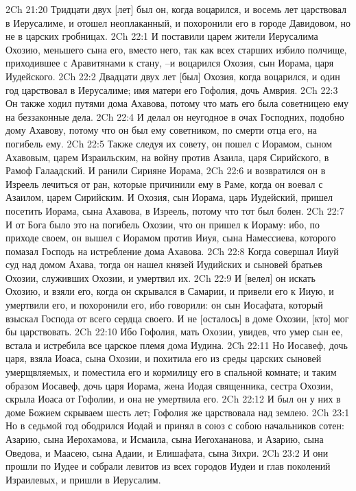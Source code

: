 2Ch 21:20  Тридцати двух [лет] был он, когда воцарился, и восемь лет царствовал в Иерусалиме, и отошел неоплаканный, и похоронили его в городе Давидовом, но не в царских гробницах.
2Ch 22:1  И поставили царем жители Иерусалима Охозию, меньшего сына его, вместо него, так как всех старших избило полчище, приходившее с Аравитянами к стану, --и воцарился Охозия, сын Иорама, царя Иудейского.
2Ch 22:2  Двадцати двух лет [был] Охозия, когда воцарился, и один год царствовал в Иерусалиме; имя матери его Гофолия, дочь Амврия.
2Ch 22:3  Он также ходил путями дома Ахавова, потому что мать его была советницею ему на беззаконные дела.
2Ch 22:4  И делал он неугодное в очах Господних, подобно дому Ахавову, потому что он был ему советником, по смерти отца его, на погибель ему.
2Ch 22:5  Также следуя их совету, он пошел с Иорамом, сыном Ахавовым, царем Израильским, на войну против Азаила, царя Сирийского, в Рамоф Галаадский. И ранили Сирияне Иорама,
2Ch 22:6  и возвратился он в Изреель лечиться от ран, которые причинили ему в Раме, когда он воевал с Азаилом, царем Сирийским. И Охозия, сын Иорама, царь Иудейский, пришел посетить Иорама, сына Ахавова, в Изреель, потому что тот был болен.
2Ch 22:7  И от Бога было это на погибель Охозии, что он пришел к Иораму: ибо, по приходе своем, он вышел с Иорамом против Ииуя, сына Намессиева, которого помазал Господь на истребление дома Ахавова.
2Ch 22:8  Когда совершал Ииуй суд над домом Ахава, тогда он нашел князей Иудийских и сыновей братьев Охозии, служивших Охозии, и умертвил их.
2Ch 22:9  И [велел] он искать Охозию, и взяли его, когда он скрывался в Самарии, и привели его к Ииую, и умертвили его, и похоронили его, ибо говорили: он сын Иосафата, который взыскал Господа от всего сердца своего. И не [осталось] в доме Охозии, [кто] мог бы царствовать.
2Ch 22:10  Ибо Гофолия, мать Охозии, увидев, что умер сын ее, встала и истребила все царское племя дома Иудина.
2Ch 22:11  Но Иосавеф, дочь царя, взяла Иоаса, сына Охозии, и похитила его из среды царских сыновей умерщвляемых, и поместила его и кормилицу его в спальной комнате; и таким образом Иосавеф, дочь царя Иорама, жена Иодая священника, сестра Охозии, скрыла Иоаса от Гофолии, и она не умертвила его.
2Ch 22:12  И был он у них в доме Божием скрываем шесть лет; Гофолия же царствовала над землею.
2Ch 23:1  Но в седьмой год ободрился Иодай и принял в союз с собою начальников сотен: Азарию, сына Иерохамова, и Исмаила, сына Иегохананова, и Азарию, сына Оведова, и Маасею, сына Адаии, и Елишафата, сына Зихри.
2Ch 23:2  И они прошли по Иудее и собрали левитов из всех городов Иудеи и глав поколений Израилевых, и пришли в Иерусалим.
